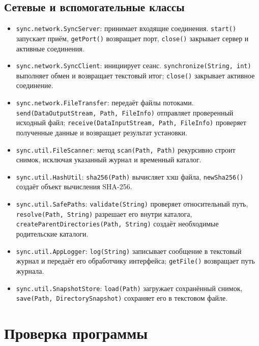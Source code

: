 \documentclass[12pt,a4paper]{article}
\begin{document}
\subsection{Сетевые и вспомогательные классы}
\begin{itemize}
\setlength{\itemsep}{0pt}
  \item \texttt{sync.network.SyncServer}: принимает входящие соединения. \texttt{start()} запускает приём, \texttt{getPort()} возвращает порт, \texttt{close()} закрывает сервер и активные соединения.
  \item \texttt{sync.network.SyncClient}: инициирует сеанс. \texttt{synchronize(String, int)} выполняет обмен и возвращает текстовый итог; \texttt{close()} закрывает активное соединение.
  \item \texttt{sync.network.FileTransfer}: передаёт файлы потоками. \texttt{send(\allowbreak DataOutputStream,\allowbreak{} Path,\allowbreak{} FileInfo)} отправляет проверенный исходный файл; \texttt{receive(\allowbreak DataInputStream,\allowbreak{} Path,\allowbreak{} FileInfo)} проверяет полученные данные и возвращает результат установки.
  \item \texttt{sync.util.FileScanner}: метод \texttt{scan(Path, Path)} рекурсивно строит снимок, исключая указанный журнал и временный каталог.
  \item \texttt{sync.util.HashUtil}: \texttt{sha256(Path)} вычисляет хэш файла, \texttt{newSha256()} создаёт объект вычисления SHA-256.
  \item \texttt{sync.util.SafePaths}: \texttt{validate(String)} проверяет относительный путь, \texttt{resolve(Path, String)} разрешает его внутри каталога, \texttt{createParentDirectories(\allowbreak Path,\allowbreak{} String)} создаёт необходимые родительские каталоги.
  \item \texttt{sync.util.AppLogger}: \texttt{log(String)} записывает сообщение в текстовый журнал и передаёт его обработчику интерфейса; \texttt{getFile()} возвращает путь журнала.
  \item \texttt{sync.util.SnapshotStore}: \texttt{load(Path)} загружает сохранённый снимок, \texttt{save(Path, DirectorySnapshot)} сохраняет его в текстовом файле.
\end{itemize}

\par\endgroup
\clearpage
\section{Проверка программы}
\end{document}
